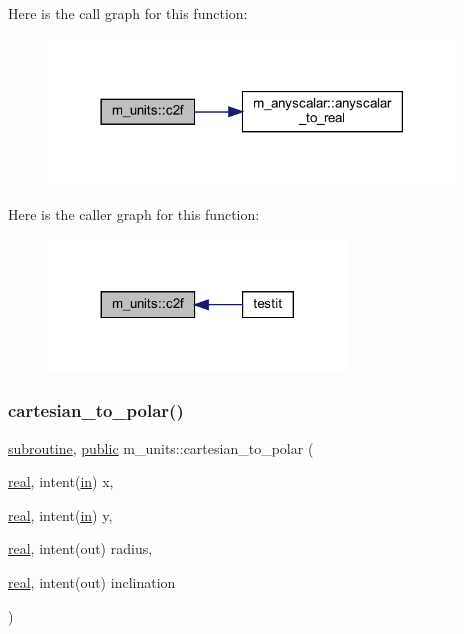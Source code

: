 Here is the call graph for this function\+:
\nopagebreak
\begin{figure}[H]
\begin{center}
\leavevmode
\includegraphics[width=306pt]{namespacem__units_a652a2565824ce7cbc692b563054ffa3e_cgraph}
\end{center}
\end{figure}
Here is the caller graph for this function\+:
\nopagebreak
\begin{figure}[H]
\begin{center}
\leavevmode
\includegraphics[width=224pt]{namespacem__units_a652a2565824ce7cbc692b563054ffa3e_icgraph}
\end{center}
\end{figure}
\mbox{\label{namespacem__units_a283a11d968cad968e33abfd6889de689}} 
\subsubsection{\texorpdfstring{cartesian\+\_\+to\+\_\+polar()}{cartesian\_to\_polar()}}
{\footnotesize\ttfamily \hyperlink{M__stopwatch_83_8txt_acfbcff50169d691ff02d4a123ed70482}{subroutine}, \hyperlink{M__stopwatch_83_8txt_a2f74811300c361e53b430611a7d1769f}{public} m\+\_\+units\+::cartesian\+\_\+to\+\_\+polar (\begin{DoxyParamCaption}\item[{\hyperlink{read__watch_83_8txt_abdb62bde002f38ef75f810d3a905a823}{real}, intent(\hyperlink{M__journal_83_8txt_afce72651d1eed785a2132bee863b2f38}{in})}]{x,  }\item[{\hyperlink{read__watch_83_8txt_abdb62bde002f38ef75f810d3a905a823}{real}, intent(\hyperlink{M__journal_83_8txt_afce72651d1eed785a2132bee863b2f38}{in})}]{y,  }\item[{\hyperlink{read__watch_83_8txt_abdb62bde002f38ef75f810d3a905a823}{real}, intent(out)}]{radius,  }\item[{\hyperlink{read__watch_83_8txt_abdb62bde002f38ef75f810d3a905a823}{real}, intent(out)}]{inclination }\end{DoxyParamCaption})}



